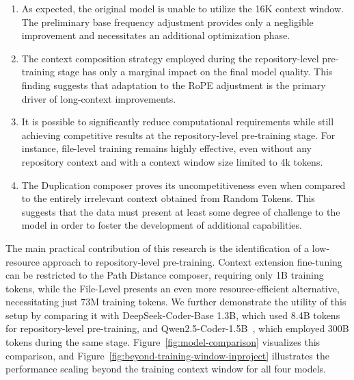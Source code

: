 \begin{enumerate}
\item As expected, the original model is unable to utilize the 16K context window. The preliminary base frequency adjustment provides only a negligible improvement and necessitates an additional optimization phase.
\item The context composition strategy employed during the repository-level pre-training stage has only a marginal impact on the final model quality. This finding suggests that adaptation to the RoPE adjustment is the primary driver of long-context improvements.
\item It is possible to significantly reduce computational requirements while still achieving competitive results at the repository-level pre-training stage. For instance, file-level training remains highly effective, even without any repository context and with a context window size limited to 4k tokens.
\item The Duplication composer proves its uncompetitiveness even when compared to the entirely irrelevant context obtained from Random Tokens. This suggests that the data must present at least some degree of challenge to the model in order to foster the development of additional capabilities.
\end{enumerate}

The main practical contribution of this research is the identification of a low-resource approach to repository-level pre-training. Context extension fine-tuning can be restricted to the Path Distance composer, requiring only 1B training tokens, while the File-Level presents an even more resource-efficient alternative, necessitating just 73M training tokens. We further demonstrate the utility of this setup by comparing it with DeepSeek-Coder-Base 1.3B, which used 8.4B tokens for repository-level pre-training, and Qwen2.5-Coder-1.5B~\parencite{hui2024}, which employed 300B tokens during the same stage. Figure~\ref{fig:model-comparison} visualizes this comparison, and Figure~\ref{fig:beyond-training-window-inproject} illustrates the performance scaling beyond the training context window for all four models.

